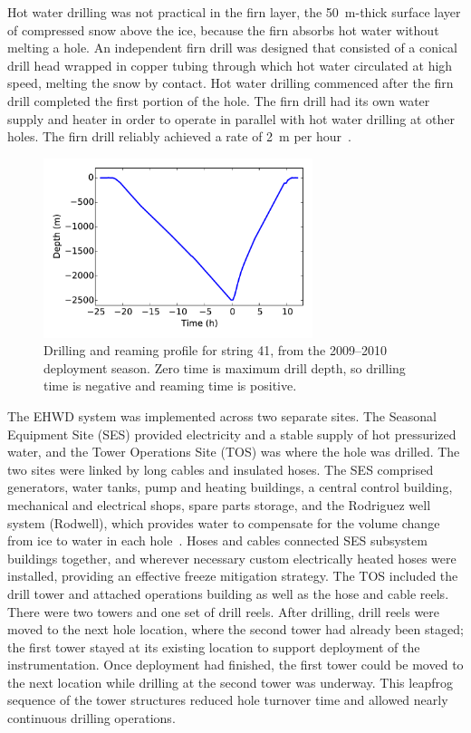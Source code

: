Hot water drilling was not practical in the firn layer, the 50~m-thick surface layer of
compressed snow above the ice, because the firn
absorbs hot water without melting a hole.  An independent
firn drill was designed that consisted of a conical drill
head wrapped in copper tubing through which hot water circulated at high speed,
melting the snow by contact. Hot water drilling commenced after the firn
drill completed the first portion of the hole. The firn drill had its own
water supply and heater in order to operate in parallel with hot water drilling
at other holes. The firn drill reliably achieved a rate of 2~m per hour~\cite{ehwd}.

\begin{figure}[!ht]
 \centering
 \includegraphics[width=0.7\textwidth]{graphics/drill/drill_depth_hole41.pdf}
\caption{Drilling and reaming profile for string 41, from the 2009--2010
  deployment season. Zero time is maximum drill depth, so drilling time is
  negative and reaming time is positive.}
\label{fig:drilldepthtime}
\end{figure}

The EHWD system was implemented across two separate sites. The Seasonal
Equipment Site (SES) provided electricity and a stable supply of hot
pressurized water, and the Tower Operations Site (TOS) was where the hole
was drilled.  The two sites were linked by long cables and insulated
hoses. The SES comprised generators, water tanks, pump and heating
buildings, a central control building, mechanical and electrical shops,
spare parts storage, and the Rodriguez well system (Rodwell), which
provides water to compensate for the volume change from ice to water
in each hole~\cite{rodriguez_well}. Hoses and cables connected SES subsystem buildings together, and
wherever necessary custom electrically heated hoses were installed,
providing an effective freeze mitigation strategy. The TOS included the
drill tower and attached operations building as well as the hose and cable
reels.  There were two towers and one set of drill reels.  After drilling,
drill reels were moved to the next hole location, where the second tower
had already been staged; the first tower stayed at its existing location
to support deployment of the instrumentation.  Once deployment had
finished, the first tower could be moved to the next location while
drilling at the second tower was underway.  This leapfrog sequence of the
tower structures reduced hole turnover time and allowed nearly
continuous drilling operations.

